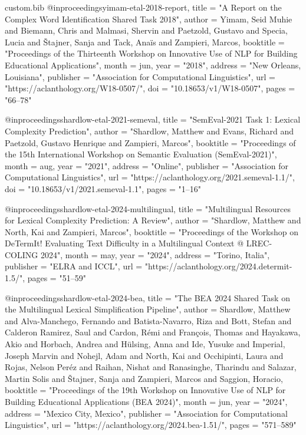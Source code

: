 \begin{filecontents*}[overwrite]{custom.bib}
@inproceedings{yimam-etal-2018-report,
    title = "A Report on the Complex Word Identification Shared Task 2018",
    author = {Yimam, Seid Muhie  and
      Biemann, Chris  and
      Malmasi, Shervin  and
      Paetzold, Gustavo  and
      Specia, Lucia  and
      {\v{S}}tajner, Sanja  and
      Tack, Ana{\"i}s  and
      Zampieri, Marcos},
    booktitle = "Proceedings of the Thirteenth Workshop on Innovative Use of {NLP} for Building Educational Applications",
    month = jun,
    year = "2018",
    address = "New Orleans, Louisiana",
    publisher = "Association for Computational Linguistics",
    url = "https://aclanthology.org/W18-0507/",
    doi = "10.18653/v1/W18-0507",
    pages = "66--78"
}

@inproceedings{shardlow-etal-2021-semeval,
    title = "{S}em{E}val-2021 Task 1: Lexical Complexity Prediction",
    author = "Shardlow, Matthew  and
      Evans, Richard  and
      Paetzold, Gustavo Henrique  and
      Zampieri, Marcos",
    booktitle = "Proceedings of the 15th International Workshop on Semantic Evaluation (SemEval-2021)",
    month = aug,
    year = "2021",
    address = "Online",
    publisher = "Association for Computational Linguistics",
    url = "https://aclanthology.org/2021.semeval-1.1/",
    doi = "10.18653/v1/2021.semeval-1.1",
    pages = "1--16"
}

@inproceedings{shardlow-etal-2024-multilingual,
    title = "Multilingual Resources for Lexical Complexity Prediction: A Review",
    author = "Shardlow, Matthew  and
      North, Kai  and
      Zampieri, Marcos",
    booktitle = "Proceedings of the Workshop on DeTermIt! Evaluating Text Difficulty in a Multilingual Context @ LREC-COLING 2024",
    month = may,
    year = "2024",
    address = "Torino, Italia",
    publisher = "ELRA and ICCL",
    url = "https://aclanthology.org/2024.determit-1.5/",
    pages = "51--59"
}

@inproceedings{shardlow-etal-2024-bea,
    title = "The {BEA} 2024 Shared Task on the Multilingual Lexical Simplification Pipeline",
    author = {Shardlow, Matthew  and
      Alva-Manchego, Fernando  and
      Batista-Navarro, Riza  and
      Bott, Stefan  and
      Calderon Ramirez, Saul  and
      Cardon, R{\'e}mi  and
      Fran{\c{c}}ois, Thomas  and
      Hayakawa, Akio  and
      Horbach, Andrea  and
      H{\"u}lsing, Anna  and
      Ide, Yusuke  and
      Imperial, Joseph Marvin  and
      Nohejl, Adam  and
      North, Kai  and
      Occhipinti, Laura  and
      Rojas, Nelson Per{\'e}z  and
      Raihan, Nishat  and
      Ranasinghe, Tharindu  and
      Salazar, Martin Solis  and
      {\v{S}}tajner, Sanja  and
      Zampieri, Marcos  and
      Saggion, Horacio},
    booktitle = "Proceedings of the 19th Workshop on Innovative Use of NLP for Building Educational Applications (BEA 2024)",
    month = jun,
    year = "2024",
    address = "Mexico City, Mexico",
    publisher = "Association for Computational Linguistics",
    url = "https://aclanthology.org/2024.bea-1.51/",
    pages = "571--589"
}


\end{filecontents*}
